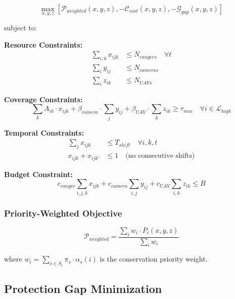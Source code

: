 \begin{equation}
\max_{x, y, z} \left[ \mathcal{P}_{weighted}(x, y, z), -\mathcal{C}_{cost}(x, y, z), -\mathcal{G}_{gap}(x, y, z) \right]
\label{eq:multi_objective}
\end{equation}

subject to:

\noindent \textbf{Resource Constraints:}
\begin{align}
\sum_{i,k} x_{ijk} &\leq N_{rangers} \quad \forall t \label{eq:ranger_limit} \\
\sum_{i} y_{ij} &\leq N_{cameras} \label{eq:camera_limit} \\
\sum_{i} z_{ik} &\leq N_{UAVs} \label{eq:uav_limit}
\end{align}

\noindent \textbf{Coverage Constraints:}
\begin{equation}
\sum_{k} A_{ik} \cdot x_{ijk} + \beta_{camera} \cdot \sum_{j} y_{ij} + \beta_{UAV} \cdot \sum_{k} z_{ik} \geq \tau_{min} \quad \forall i \in \mathcal{L}_{high}
\label{eq:coverage_requirement}
\end{equation}

\noindent \textbf{Temporal Constraints:}
\begin{align}
\sum_{j} x_{ijk} &\leq T_{shift} \quad \forall i, k, t \label{eq:shift_limit} \\
x_{ijk} + x_{ijk'} &\leq 1 \quad \text{(no consecutive shifts)}
\end{align}

\noindent \textbf{Budget Constraint:}
\begin{equation}
c_{ranger} \sum_{i,j,k} x_{ijk} + c_{camera} \sum_{i,j} y_{ij} + c_{UAV} \sum_{i,k} z_{ik} \leq B
\label{eq:budget}
\end{equation}

\subsubsection{Priority-Weighted Objective}

\begin{equation}
\mathcal{P}_{weighted} = \frac{\sum_{i} w_i \cdot P_i(x, y, z)}{\sum_{i} w_i}
\label{eq:weighted_protection}
\end{equation}

where $w_i = \sum_{s \in S_i} \pi_s \cdot \alpha_s(i)$ is the conservation priority weight.

\subsection{Protection Gap Minimization}


